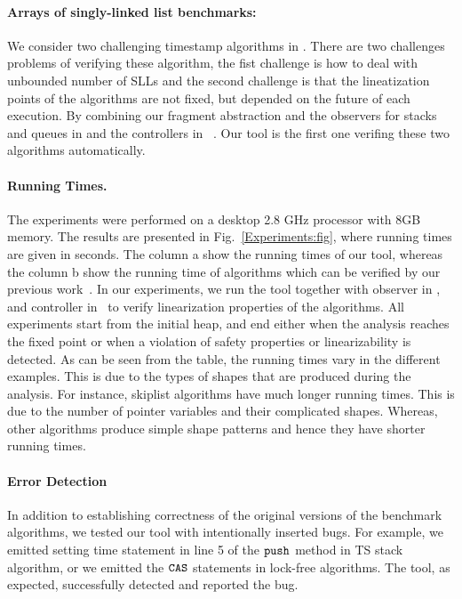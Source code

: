 \paragraph{Arrays of singly-linked list benchmarks:} We consider two challenging timestamp algorithms in \cite{ts-stack}. There are two challenges problems of verifying these algorithm, the fist challenge is how to deal with unbounded number of SLLs and the second challenge is that the lineatization points of the algorithms are not fixed, but depended on the future of each execution. By combining our fragment abstraction and the observers for stacks and queues in \cite{BEEH:icalp15} and the controllers in~\cite{Quy:sas16} . Our tool is the first one verifing these two algorithms automatically.

\paragraph{Running Times.}The experiments were performed on a desktop 2.8 GHz processor with 8GB memory. The results are presented in Fig.~\ref{Experiments:fig}, where running times are given in seconds. The column \textsf{a} show the running times of our tool, whereas the column \textsf{b} show the running time of algorithms which can be verified by our previous work~\cite{Quy:sas16}.  In our experiments, we run the tool together with observer in \cite{AHHR:integrated}, \cite{BEEH:icalp15} and controller in~\cite{Quy:sas16} to verify linearization properties of the algorithms. All experiments start from the initial heap,  
and end either when the analysis reaches the fixed point or when a violation of safety properties or linearizability is detected. As can be seen from the table, the running times vary in the different examples. This is due to the types of shapes that are produced during the analysis. For instance, skiplist algorithms have much longer running times. This is due to the number of pointer variables and their complicated shapes. Whereas, other algorithms 
produce simple shape patterns and hence they have shorter running times.
\paragraph{Error Detection}
 In addition to establishing correctness of the original versions of the
benchmark algorithms, we tested our tool with intentionally inserted bugs. For example, we emitted setting time statement in line 5 of the ${\tt push}$ method in TS stack algorithm, or we emitted the $\tt CAS$ statements in lock-free algorithms. The tool, as expected, successfully detected and reported the bug. 
 


